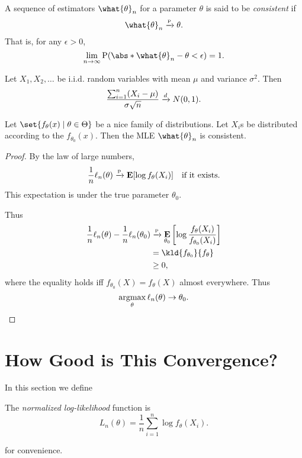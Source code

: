 
\begin{definition*}[Consistency] \label{def:mle:consistency}
    A sequence of estimators $\what{\theta}_n$ for a parameter $\theta$
    is said to be \emph{consistent} if \[
        \what{\theta}_n \pto \theta.
    \] That is, for any $\epsilon > 0$, \[
        \lim_{n \to \infty}
            \Pr(\abs*{\what{\theta}_n - \theta} < \epsilon) = 1.
    \]
\end{definition*}

\begin{theorem} \label{thm:mle:clt}
    Let $X_1, X_2, \ldots$ be i.i.d. random variables with mean $\mu$
    and variance $\sigma^2$.
    Then \[
        \frac{\sum_{i=1}^n (X_i - \mu)}{\sigma \sqrt{n}}
        \xrightarrow{d} N(0, 1).
    \]
\end{theorem}

\begin{theorem}
    Let $\set{f_\theta(x) \mid \theta \in \Theta}$ be a nice family of
    distributions.
    Let $X_i$s be distributed according to the $f_{\theta_0}(x)$.
    Then the MLE $\what{\theta}_n$ is consistent.
\end{theorem}
\begin{proof}
    By the law of large numbers, \[
        \frac1n \ell_n(\theta)
            \xrightarrow{\text{\tiny P}} \operatorname*{\textbf{E}}[\log f_\theta(X_i)] \quad\text{if it exists.}
    \] This expectation is under the true parameter $\theta_0$.

    Thus \begin{align*}
        \frac1n \ell_n(\theta) - \frac1n \ell_n(\theta_0)
            &\pto \E_{\theta_0}\left[\log \frac{f_\theta(X_i)}{f_{\theta_0}(X_i)}\right] \\
            &= \kld{f_{\theta_0}}{f_\theta} \\
            &\ge 0,
    \end{align*} where the equality holds iff $f_{\theta_0}(X) = f_\theta(X)$
    almost everywhere.
    Thus \[
        \operatorname*{argmax}_\theta \ell_n(\theta) \to \theta_0. \qedhere
    \]
\end{proof}

\section{How Good is This Convergence?} \label{sec:mle:normality}
In this section we define
\begin{definition} \label{def:mle:log-likelihood}
    The \emph{normalized log-likelihood} function is \[
        L_n(\theta) = \frac1n \sum_{i=1}^n \log f_\theta(X_i).
    \]
\end{definition}
for convenience.

